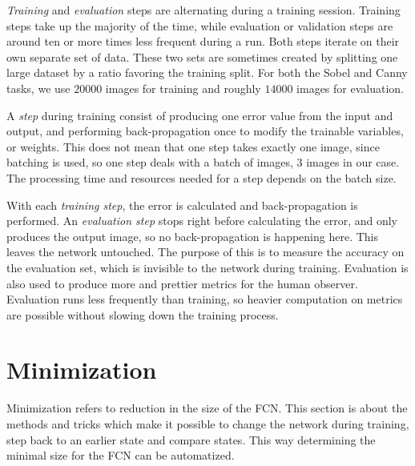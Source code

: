 \documentclass[12pt]{report}
\begin{document}
\textit{Training} and \textit{evaluation} steps are alternating during a training session. Training steps take up the majority of the time, while evaluation or validation steps are around ten or more times less frequent during a run. Both steps iterate on their own separate set of data. These two sets are sometimes created by splitting one large dataset by a ratio favoring the training split. For both the Sobel and Canny tasks, we use $20000$ images for training and roughly $14000$ images for evaluation.

A \textit{step} during training consist of producing one error value from the input and output, and performing back-propagation once to modify the trainable variables, or weights. This does not mean that one step takes exactly one image, since batching is used, so one step deals with a batch of images, $3$ images in our case. The processing time and resources needed for a step depends on the batch size.

With each \textit{training step}, the error is calculated and back-propagation is performed. An \textit{evaluation step} stops right before calculating the error, and only produces the output image, so no back-propagation is happening here. This leaves the network untouched. The purpose of this is to measure the accuracy on the evaluation set, which is invisible to the network during training. Evaluation is also used to produce more and prettier metrics for the human observer. Evaluation runs less frequently than training, so heavier computation on metrics are possible without slowing down the training process.
\section{Minimization}\label{min}
Minimization refers to reduction in the size of the FCN. This section is about the methods and tricks which make it possible to change the network during training, step back to an earlier state and compare states. This way determining the minimal size for the FCN can be automatized.
\end{document}
